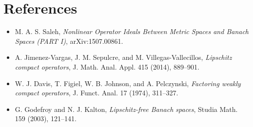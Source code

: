 \documentclass[11pt]{article}
\begin{document}
\section*{References}

\begin{itemize}
\item M. A. S. Saleh, \emph{Nonlinear Operator Ideals Between Metric Spaces and Banach Spaces (PART I)}, arXiv:1507.00861.
\item A. Jimenez-Vargas, J. M. Sepulcre, and M. Villegas-Vallecillos, \emph{Lipschitz compact operators}, J. Math. Anal. Appl. 415 (2014), 889--901.
\item W. J. Davis, T. Figiel, W. B. Johnson, and A. Pelczynski, \emph{Factoring weakly compact operators}, J. Funct. Anal. 17 (1974), 311--327.
\item G. Godefroy and N. J. Kalton, \emph{Lipschitz-free Banach spaces}, Studia Math. 159 (2003), 121--141.
\end{itemize}
\end{document}
